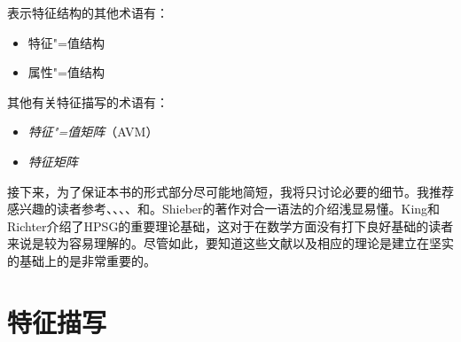 表示特征结构的其他术语有：
\begin{itemize}
\item 特征"=值结构
\item 属性"=值结构
\end{itemize}
其他有关特征描写的术语有：
\begin{itemize}
\item \emph{特征"=值矩阵}（AVM）
\item \emph{特征矩阵}
\end{itemize}
接下来，为了保证本书的形式部分尽可能地简短，我将只讨论必要的细节。我推荐感兴趣的读者参考\citet{Shieber86a}、\citet[第2章]{ps}、\citet{Johnson88}、\citet{Carpenter92a}、\citet{King94a}和\citet{Richter2004a-u}。Shieber的著作对合一语法的介绍浅显易懂。King和Richter介绍了HPSG的重要理论基础，这对于在数学方面没有打下良好基础的读者来说是较为容易理解的。尽管如此，要知道这些文献以及相应的理论是建立在坚实的基础上的是非常重要的。

\section{特征描写}

